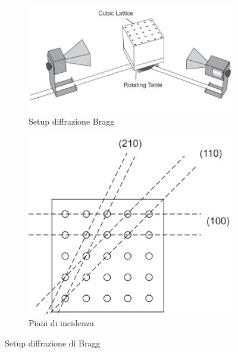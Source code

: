 \documentclass[letterpaper,12pt]{article}
\begin{document}
\begin{figure}[h!]
	\centering
	\begin{subfigure}[b]{0.48\textwidth} %
		\centering
		\includegraphics[width=\textwidth]{setup_bragg.png}
		\caption{Setup diffrazione Bragg}
		\label{fig:Setup Bragg}
	\end{subfigure}
	\hfill %
	\begin{subfigure}[b]{0.3\textwidth} %
		\centering
		\includegraphics[width=\textwidth]{piani_bragg.png}
		\caption{Piani di incidenza}
		\label{fig:Piani di Bragg}
	\end{subfigure}
	\caption{Setup diffrazione di Bragg}
\end{figure}
\end{document}
